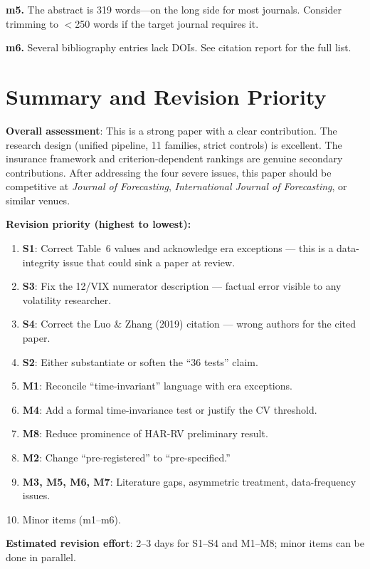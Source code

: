 \documentclass[12pt,a4paper]{article}
\begin{document}
\textbf{m5.} The abstract is 319 words---on the long side for most journals. Consider trimming to $<$250 words if the target journal requires it.

\textbf{m6.} Several bibliography entries lack DOIs. See citation report for the full list.


\section*{Summary and Revision Priority}

\textbf{Overall assessment}: This is a strong paper with a clear contribution. The research design (unified pipeline, 11 families, strict controls) is excellent. The insurance framework and criterion-dependent rankings are genuine secondary contributions. After addressing the four severe issues, this paper should be competitive at \textit{Journal of Forecasting}, \textit{International Journal of Forecasting}, or similar venues.

\bigskip
\noindent
\textbf{Revision priority (highest to lowest):}

\begin{enumerate}
\item \textcolor{errorred}{\textbf{S1}}: Correct Table~6 values and acknowledge era exceptions --- this is a data-integrity issue that could sink a paper at review.
\item \textcolor{errorred}{\textbf{S3}}: Fix the 12/VIX numerator description --- factual error visible to any volatility researcher.
\item \textcolor{errorred}{\textbf{S4}}: Correct the Luo \& Zhang (2019) citation --- wrong authors for the cited paper.
\item \textcolor{errorred}{\textbf{S2}}: Either substantiate or soften the ``36 tests'' claim.
\item \textcolor{warncolor}{\textbf{M1}}: Reconcile ``time-invariant'' language with era exceptions.
\item \textcolor{warncolor}{\textbf{M4}}: Add a formal time-invariance test or justify the CV threshold.
\item \textcolor{warncolor}{\textbf{M8}}: Reduce prominence of HAR-RV preliminary result.
\item \textcolor{warncolor}{\textbf{M2}}: Change ``pre-registered'' to ``pre-specified.''
\item \textcolor{warncolor}{\textbf{M3, M5, M6, M7}}: Literature gaps, asymmetric treatment, data-frequency issues.
\item Minor items (m1--m6).
\end{enumerate}

\bigskip
\noindent
\textbf{Estimated revision effort}: 2--3 days for S1--S4 and M1--M8; minor items can be done in parallel.
\end{document}
